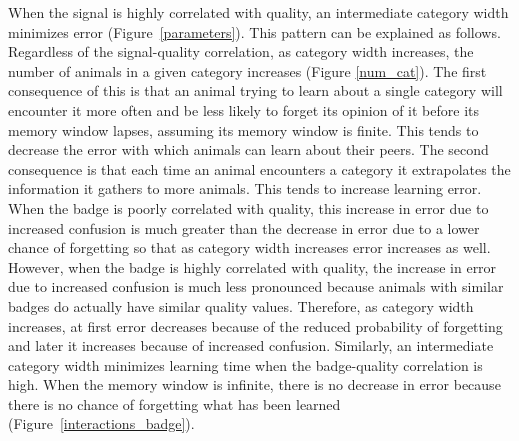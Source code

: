  
When the signal is highly correlated with quality, an intermediate category width minimizes error (Figure~\ref{parameters}). This pattern can be explained as follows. Regardless of the signal-quality correlation, as category width increases, the number of animals in a given category increases (Figure \ref{num_cat}). The first consequence of this is that an animal trying to learn about a single category will encounter it more often and be less likely to forget its opinion of it before its memory window lapses, assuming its memory window is finite. This tends to decrease the error with which animals can learn about their peers. The second consequence is that each time an animal encounters a category it extrapolates the information it gathers to more animals. This tends to increase learning error. When the badge is poorly correlated with quality, this increase in error due to increased confusion is much greater than the decrease in error due to a lower chance of forgetting so that as category width increases error increases as well. However, when the badge is highly correlated with quality, the increase in error due to increased confusion is much less pronounced because animals with similar badges do actually have similar quality values. Therefore, as category width increases, at first error decreases because of the reduced probability of forgetting and later it increases because of increased confusion. Similarly, an intermediate category width minimizes learning time when the badge-quality correlation is high. When the memory window is infinite, there is no decrease in error because there is no chance of forgetting what has been learned (Figure~\ref{interactions_badge}).
%
